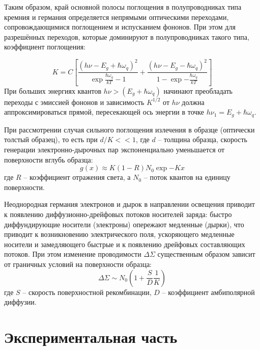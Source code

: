 \documentclass[a4paper, 12pt]{article}
\begin{document}
Таким образом, край основной полосы поглощения в полупроводниках типа кремния и германия определяется непрямыми оптическими переходами, сопровождающимися поглощением и испусканием фононов. При этом для разрешённых переходов, которые доминируют в полупроводниках такого типа, коэффициент поглощения:

    \begin{equation}
        K=C\left[\frac{(h\nu-E_g+\hbar\omega_q)^2}{\exp{\frac{\hbar\omega_q}{kT}}-1}+\frac{(h\nu-E_g-\hbar\omega_q)^2}{1-\exp{-\frac{\hbar\omega_q}{kT}}}\right]
    \end{equation}
При больших энергиях квантов $h\nu>(E_g+\hbar\omega_q)$ начинают преобладать переходы с эмиссией фононов и зависимость $K^{1/2}$ от $h\nu$ должна аппроксимироваться прямой, пересекающей ось энергии в точке $h\nu_1=E_g+\hbar\omega_q$.

При рассмотрении случая сильного поглощения излечения в образце (оптически толстый образец), то есть при $d/K<<1$, где $d$ -- толщина образца, скорость генерации электронно-дырочных пар экспоненциально уменьшается от поверхности вглубь образца:
    \begin{equation}
        g(x)\approx K(1-R)N_0\exp{-Kx}
    \end{equation}
    где $R$ -- коэффициент отражения света, а $N_0$ -- поток квантов на единицу поверхности.

Неоднородная германия электронов и дырок в направлении освещения приводит к появлению диффузионно-дрейфовых потоков носителей заряда: быстро диффундирующие носители (электроны) опережают медленные (дырки), что приводит к возникновению электрического поля, ускоряющего медленные носители и замедляющего быстрые и к появлению дрейфовых составляющих потоков. При этом изменение проводимости $\Delta\Sigma$ существенным образом зависит от граничных условий на поверхности образца:
    \begin{equation}
        \Delta\Sigma\sim N_0\left(1+\frac{S}{D}\frac{1}{K}\right)
    \end{equation}
    где $S$ -- скорость поверхностной рекомбинации, $D$ -- коэффициент амбиполярной диффузии.





\section{Экспериментальная часть}
\end{document}
